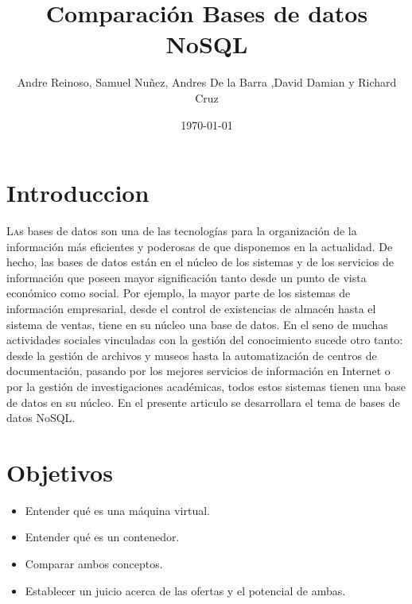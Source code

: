 \documentclass[twoside,twocolumn]{article}
\title{Comparación Bases de datos NoSQL} %
\author{Andre Reinoso, Samuel Nuñez, Andres De la Barra ,David Damian y Richard Cruz}
\date{\today} %
\begin{document}
\maketitle


\section{Introduccion}
\lettrine[nindent=0em,lines=3]{L}as bases de datos son una de las tecnologías para la organización de la información más eficientes y poderosas de que disponemos en la actualidad. De hecho, las bases de datos están en el núcleo de los sistemas y de los servicios de información que poseen mayor significación tanto desde un punto de vista económico como social. Por ejemplo, la mayor parte de los sistemas de información empresarial, desde el control de existencias de almacén hasta el sistema de ventas, tiene en su núcleo una base de datos. En el seno de muchas actividades sociales vinculadas con la gestión del conocimiento sucede otro tanto: desde la gestión de archivos y museos hasta la automatización de centros de documentación, pasando por los mejores servicios de información en Internet o por la gestión de investigaciones académicas, todos estos sistemas tienen una base de datos en su núcleo. En el presente articulo se desarrollara el tema de bases de datos NoSQL.



\section{Objetivos}

\begin{itemize}
\item Entender qué es una máquina virtual.
\item Entender qué es un contenedor.
\item Comparar ambos conceptos.
\item Establecer un juicio acerca de las ofertas y el potencial de ambas.

\end{itemize}




\end{document}

